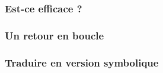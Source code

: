 \subsubsection{Est-ce efficace ?}
    


\subsubsection{Un retour en boucle}
    


\subsubsection{Traduire en version symbolique}
    

